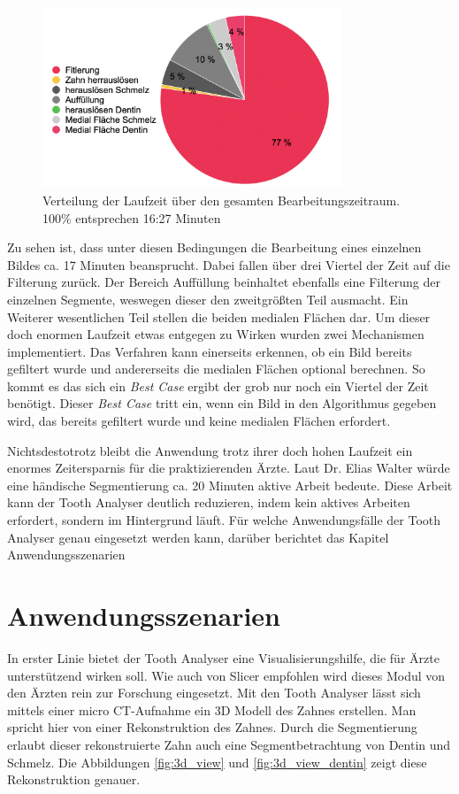 \begin{figure}[h]
	\centering
	\includegraphics[width=0.8\textwidth]{img/laufzeit_diagramm.png}
	\caption{Verteilung der Laufzeit über den gesamten Bearbeitungszeitraum. 100\%
	entsprechen 16:27 Minuten}
	\label{fig:laufzeit}
\end{figure}

Zu sehen ist, dass unter diesen Bedingungen die Bearbeitung eines einzelnen
Bildes ca. 17 Minuten beansprucht. Dabei fallen über drei Viertel der Zeit auf
die Filterung zurück. Der Bereich Auffüllung beinhaltet ebenfalls eine Filterung
der einzelnen Segmente, weswegen dieser den zweitgrößten Teil ausmacht. Ein Weiterer
wesentlichen Teil stellen die beiden medialen Flächen dar. Um dieser doch
enormen Laufzeit etwas entgegen zu Wirken wurden zwei Mechanismen implementiert.
Das Verfahren kann einerseits erkennen, ob ein Bild bereits gefiltert wurde und
andererseits die medialen Flächen optional berechnen. So kommt es das sich ein \textit{Best
Case} ergibt der grob nur noch ein Viertel der Zeit benötigt. Dieser \textit{Best
Case} tritt ein, wenn ein Bild in den Algorithmus gegeben wird, das bereits
gefiltert wurde und keine medialen Flächen erfordert.

Nichtsdestotrotz bleibt die Anwendung trotz ihrer doch hohen Laufzeit ein
enormes Zeitersparnis für die praktizierenden Ärzte. Laut Dr. Elias Walter würde
eine händische Segmentierung ca. 20 Minuten aktive Arbeit bedeute. Diese Arbeit
kann der Tooth Analyser deutlich reduzieren, indem kein aktives Arbeiten erfordert,
sondern im Hintergrund läuft. Für welche Anwendungsfälle der Tooth Analyser genau
eingesetzt werden kann, darüber berichtet das Kapitel Anwendungsszenarien

\section{Anwendungsszenarien}
In erster Linie bietet der Tooth Analyser eine Visualisierungshilfe, die für
Ärzte unterstützend wirken soll. Wie auch von Slicer empfohlen wird dieses Modul
von den Ärzten rein zur Forschung eingesetzt. Mit den Tooth Analyser lässt sich
mittels einer micro CT-Aufnahme ein 3D Modell des Zahnes erstellen. Man spricht hier
von einer Rekonstruktion des Zahnes. Durch die Segmentierung erlaubt dieser
rekonstruierte Zahn auch eine Segmentbetrachtung von Dentin und Schmelz. Die Abbildungen
\ref{fig:3d_view} und \ref{fig:3d_view_dentin} zeigt diese Rekonstruktion genauer.

